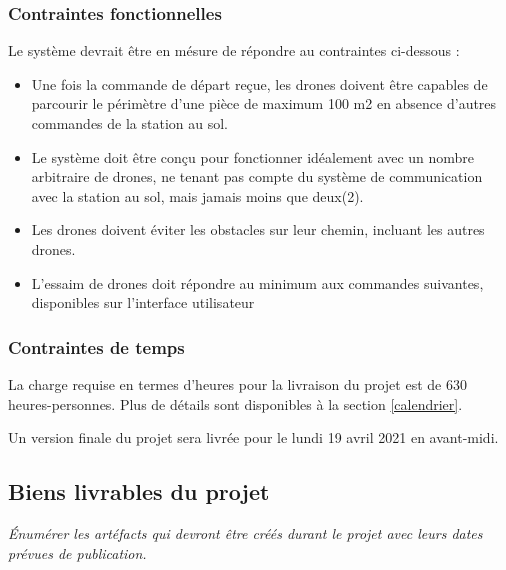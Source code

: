 \documentclass{mistcoursedoc}
\begin{document}
\subsubsection{Contraintes fonctionnelles}
Le système devrait être en mésure de répondre au contraintes ci-dessous :

\begin{itemize}
  \item Une fois la commande de départ reçue, les drones doivent être capables de parcourir le périmètre 
  d’une pièce de maximum 100 m2 en absence d’autres commandes de la station au sol.
  \item Le système doit être conçu pour fonctionner idéalement avec un nombre arbitraire de drones, 
  ne tenant pas compte du système de communication avec la station au sol, mais jamais moins que deux(2).
  \item Les drones doivent éviter les obstacles sur leur chemin, incluant les autres drones.
  \item L’essaim de drones doit répondre au minimum aux commandes suivantes, disponibles sur l’interface utilisateur
\end{itemize}

\subsubsection{Contraintes de temps}
La charge requise en termes d’heures pour la livraison du projet est de 630 heures-personnes. 
Plus de détails sont disponibles à la section \ref{calendrier}.

Un version finale du projet sera livrée pour le lundi 19 avril 2021 en avant-midi.


\subsection{Biens livrables du projet}
\textit{Énumérer les artéfacts qui devront être créés durant le projet avec leurs dates prévues de publication.}
\end{document}
